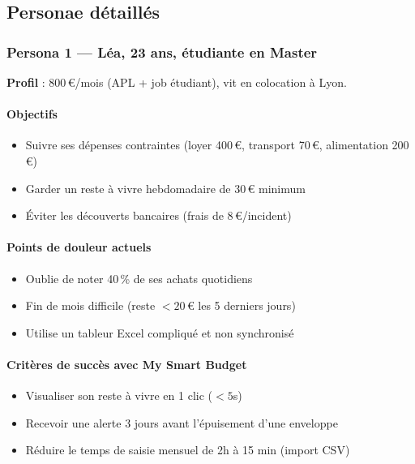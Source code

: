 \subsection{Personae détaillés}

\subsubsection{Persona 1 --- Léa, 23 ans, étudiante en Master}

\textbf{Profil} : 800\,€/mois (APL + job étudiant), vit en colocation à Lyon.

\paragraph{Objectifs}
\begin{itemize}
  \item Suivre ses dépenses contraintes (loyer 400\,€, transport 70\,€, alimentation 200\,€)
  \item Garder un reste à vivre hebdomadaire de 30\,€ minimum
  \item Éviter les découverts bancaires (frais de 8\,€/incident)
\end{itemize}

\paragraph{Points de douleur actuels}
\begin{itemize}
  \item Oublie de noter 40\,\% de ses achats quotidiens
  \item Fin de mois difficile (reste $< 20$\,€ les 5 derniers jours)
  \item Utilise un tableur Excel compliqué et non synchronisé
\end{itemize}

\paragraph{Critères de succès avec My Smart Budget}
\begin{itemize}
  \item Visualiser son reste à vivre en 1 clic ($< 5$s)
  \item Recevoir une alerte 3 jours avant l'épuisement d'une enveloppe
  \item Réduire le temps de saisie mensuel de 2h à 15 min (import CSV)
\end{itemize}

